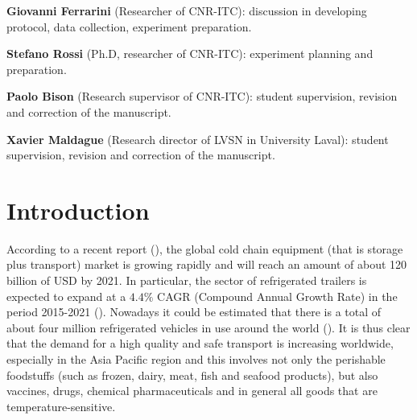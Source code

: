 \textbf{Giovanni Ferrarini} (Researcher of CNR-ITC): discussion in developing protocol, data collection, experiment preparation.

\textbf{Stefano Rossi} (Ph.D, researcher of CNR-ITC): experiment planning and preparation.

\textbf{Paolo Bison} (Research supervisor of CNR-ITC): student supervision, revision and correction of the manuscript. 

\textbf{Xavier Maldague} (Research director of LVSN in University Laval): student supervision, revision and correction of the manuscript.




% 

\newpage
\section{Introduction}
According to a recent report (\citet{Zion2016}), the global cold chain equipment (that is storage plus transport) market is growing rapidly and will reach an amount of about 120 billion of USD by 2021. In particular, the sector of refrigerated trailers is expected to expand at a $ 4.4\% $ CAGR (Compound Annual Growth Rate) in the period 2015-2021 (\citet{RM2015}). Nowadays it could be estimated that there is a total of about four million refrigerated vehicles in use around the world (\citet{UNEP2010}). It is thus clear that the demand for a high quality and safe transport is increasing worldwide, especially in the Asia Pacific region and this involves not only the perishable foodstuffs (such as frozen, dairy, meat, fish and seafood products), but also vaccines, drugs, chemical pharmaceuticals and in general all goods that are temperature-sensitive. 

